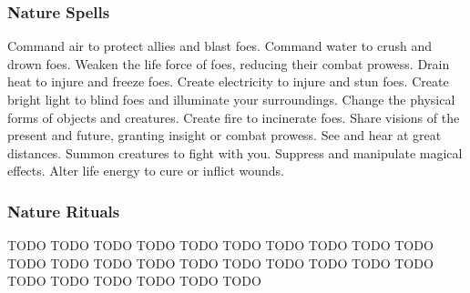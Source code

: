 \subsubsection{Nature Spells}\label{Nature Spells}
\begin{spelllist}
 Command air to protect allies and blast foes.
 Command water to crush and drown foes.
 Weaken the life force of foes, reducing their combat prowess.
 Drain heat to injure and freeze foes.
 Create electricity to injure and stun foes.
 Create bright light to blind foes and illuminate your surroundings.
 Change the physical forms of objects and creatures.
 Create fire to incinerate foes.
 Share visions of the present and future, granting insight or combat prowess.
 See and hear at great distances.
 Summon creatures to fight with you.
 Suppress and manipulate magical effects.
 Alter life energy to cure or inflict wounds.
\end{spelllist}
\subsubsection{Nature Rituals}\label{Nature Rituals}
\begin{spelllist}
 TODO
 TODO
 TODO
 TODO
 TODO
 TODO
 TODO
 TODO
 TODO
 TODO
 TODO
 TODO
 TODO
 TODO
 TODO
 TODO
 TODO
 TODO
 TODO
 TODO
 TODO
 TODO
 TODO
 TODO
 TODO
 TODO
\end{spelllist}

